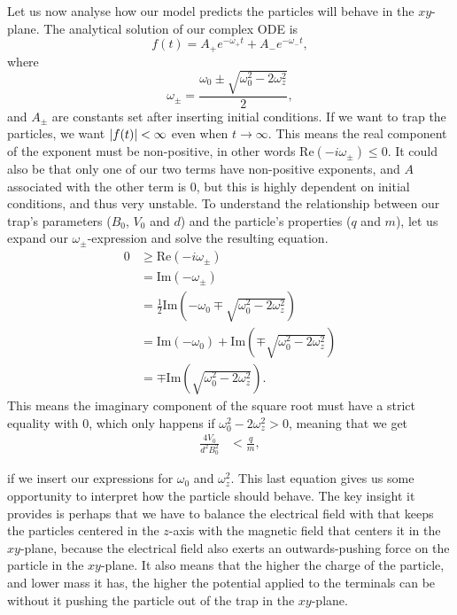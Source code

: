 Let us now analyse how our model predicts the particles will behave in the $xy$-plane. The analytical solution of our complex ODE is 
%
\begin{equation}
f(t) = A_+e^{-\omega_+ t} + A_-e^{-\omega_- t},
\label{eq:analytical_solution_xy}
\end{equation}
%
where
\begin{equation*}
\omega_\pm = \frac{\omega_0 \pm \sqrt{\omega_0^2 - 2 \omega_z^2}}{2},
\end{equation*}
and $A_\pm$ are constants set after inserting initial conditions.
%
If we want to trap the particles, we want $\abs{f(t)} < \infty$ even when $t \to \infty$. This means the real component of the exponent must be non-positive, in other words $\text{Re}(-i\omega_\pm) \leq 0$. It could also be that only one of our two terms have non-positive exponents, and $A$ associated with the other term is $0$, but this is highly dependent on initial conditions, and thus very unstable. To understand the relationship between our trap's parameters ($B_0$, $V_0$ and $d$) and the particle's properties ($q$ and $m$), let us expand our $\omega_\pm$-expression and solve the resulting equation.
%
\begin{align*}
0 &\geq \text{Re} \left(-i \omega_\pm \right) \\
  &= \text{Im} \left(- \omega_\pm \right) \\
  &= \frac{1}{2} \text{Im} \left(- \omega_0 \mp \sqrt{\omega_0^2 - 2 \omega_z^2} \right) \\
  &= \text{Im} \left(- \omega_0 \right) + \text{Im} \left( \mp \sqrt{\omega_0^2 - 2 \omega_z^2} \right) \\
  &= \mp \text{Im} \left( \sqrt{\omega_0^2 - 2 \omega_z^2} \right).
\end{align*}
%
This means the imaginary component of the square root must have a strict equality with $0$, which only happens if $\omega_0^2 - 2 \omega_z^2 > 0$, meaning that we get
%
\begin{align*}
\frac{4V_0}{d^2 B_0^2} &< \frac{q}{m},
\end{align*}

if we insert our expressions for $\omega_0$ and $\omega_z^2$. This last equation gives us some opportunity to interpret how the particle should behave. The key insight it provides is perhaps that we have to balance the electrical field with that keeps the particles centered in the $z$-axis with the magnetic field that centers it in the $xy$-plane, because the electrical field also exerts an outwards-pushing force on the particle in the $xy$-plane. It also means that the higher the charge of the particle, and lower mass it has, the higher the potential applied to the terminals can be without it pushing the particle out of the trap in the $xy$-plane.

